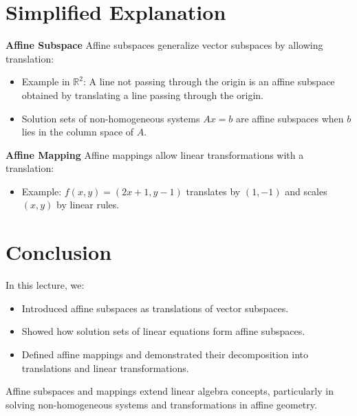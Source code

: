 \documentclass{article}
\begin{document}
\section*{Simplified Explanation}

\textbf{Affine Subspace}
Affine subspaces generalize vector subspaces by allowing translation:
\begin{itemize}
  \item Example in $\mathbb{R}^2$: A line not passing through the origin is an affine subspace obtained by translating a line passing through the origin.
  \item Solution sets of non-homogeneous systems $Ax = b$ are affine subspaces when $b$ lies in the column space of $A$.
\end{itemize}

\textbf{Affine Mapping}
Affine mappings allow linear transformations with a translation:
\begin{itemize}
  \item Example: $f(x, y) = (2x + 1, y - 1)$ translates by $(1, -1)$ and scales $(x, y)$ by linear rules.
\end{itemize}

\section*{Conclusion}

In this lecture, we:
\begin{itemize}
  \item Introduced affine subspaces as translations of vector subspaces.
  \item Showed how solution sets of linear equations form affine subspaces.
  \item Defined affine mappings and demonstrated their decomposition into translations and linear transformations.
\end{itemize}

Affine subspaces and mappings extend linear algebra concepts, particularly in solving non-homogeneous systems and transformations in affine geometry.
\end{document}
